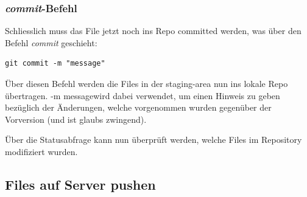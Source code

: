 \documentclass[twoside, 11pr]{article}
\begin{document}
\subsubsection{\textit{commit}-Befehl} \label{ch:commit}

Schliesslich muss das File jetzt noch ins Repo committed werden, was über den Befehl \textit{commit} geschieht:

\begin{lstlisting}
git commit -m "message"
\end{lstlisting}

Über diesen Befehl werden die Files in der staging-area nun ins lokale Repo übertragen. -m \glqq message\grqq wird dabei verwendet, um einen Hinweis zu geben bezüglich der Änderungen, welche vorgenommen wurden gegenüber der Vorversion (und ist glaubs zwingend).\newline
\par
\noindent
Über die Statusabfrage kann nun überprüft werden, welche Files im Repository modifiziert wurden.


\subsection{Files auf Server pushen}\label{ch:push}



%


\end{document}
